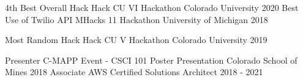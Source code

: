 \vspace{-2.0mm}

\begin{cvhonors}


  \cvhonor
  {4th Best Overall Hack}
  {Hack CU VI Hackathon}
  {Colorado University}
  {2020}
  \cvhonor
    {Best Use of Twilio API} %
    {MHacks 11 Hackathon}
    {University of Michigan} %
    {2018} %

  \cvhonor
    {Most Random Hack} %
    {Hack CU V Hackathon}
    {Colorado University} %
    {2019} %

    \cvhonor
    {Presenter} %
    {C-MAPP Event - CSCI 101 Poster Presentation}
    {Colorado School of Mines} %
    {2018} %
  \cvhonor
    {Associate} %
    {AWS Certified Solutions Architect }
    {} %
    {2018 - 2021} %

\end{cvhonors}
